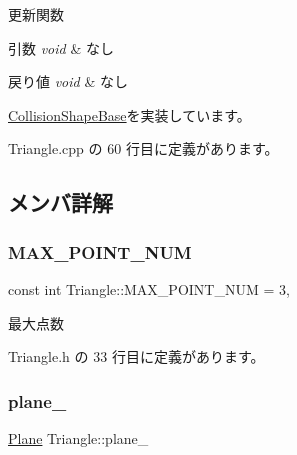 更新関数 


\begin{DoxyParams}{引数}
{\em void} & なし \\
\hline
\end{DoxyParams}

\begin{DoxyRetVals}{戻り値}
{\em void} & なし \\
\hline
\end{DoxyRetVals}


\mbox{\hyperlink{class_collision_shape_base_a7aaa0f4de4e208f168f78e3445313929}{Collision\+Shape\+Base}}を実装しています。



 Triangle.\+cpp の 60 行目に定義があります。



\subsection{メンバ詳解}
\mbox{\label{class_triangle_aa79a559da8bd7104052922b6c8c40287}} 
\subsubsection{\texorpdfstring{M\+A\+X\+\_\+\+P\+O\+I\+N\+T\+\_\+\+N\+UM}{MAX\_POINT\_NUM}}
{\footnotesize\ttfamily const int Triangle\+::\+M\+A\+X\+\_\+\+P\+O\+I\+N\+T\+\_\+\+N\+UM = 3\hspace{0.3cm}{\ttfamily [static]}, {\ttfamily [private]}}



最大点数 



 Triangle.\+h の 33 行目に定義があります。

\mbox{\label{class_triangle_a93586199c2c173771f2e167f477eaa70}} 
\subsubsection{\texorpdfstring{plane\+\_\+}{plane\_}}
{\footnotesize\ttfamily \mbox{\hyperlink{class_plane}{Plane}} Triangle\+::plane\+\_\+\hspace{0.3cm}{\ttfamily [private]}}



